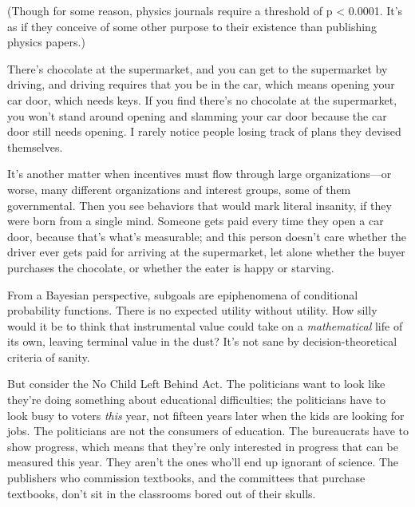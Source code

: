 {
 (Though for some reason, physics journals require a threshold of p
{\textless} 0.0001. It's as if they conceive of some
other purpose to their existence than publishing physics papers.)}

{
 There's chocolate at the supermarket, and you can
get to the supermarket by driving, and driving requires that you be in
the car, which means opening your car door, which needs keys. If you
find there's no chocolate at the supermarket, you
won't stand around opening and slamming your car door
because the car door still needs opening. I rarely notice people losing
track of plans they devised themselves.}

{
 It's another matter when incentives must flow
through large organizations---or worse, many different organizations
and interest groups, some of them governmental. Then you see behaviors
that would mark literal insanity, if they were born from a single mind.
Someone gets paid every time they open a car door, because
that's what's measurable; and this
person doesn't care whether the driver ever gets paid
for arriving at the supermarket, let alone whether the buyer purchases
the chocolate, or whether the eater is happy or starving.}

{
 From a Bayesian perspective, subgoals are epiphenomena of
conditional probability functions. There is no expected utility without
utility. How silly would it be to think that instrumental value could
take on a \textit{mathematical} life of its own, leaving terminal value
in the dust? It's not sane by decision-theoretical
criteria of sanity.}

{
 But consider the No Child Left Behind Act. The politicians want to
look like they're doing something about educational
difficulties; the politicians have to look busy to voters \textit{this}
year, not fifteen years later when the kids are looking for jobs. The
politicians are not the consumers of education. The bureaucrats have to
show progress, which means that they're only interested
in progress that can be measured this year. They aren't
the ones who'll end up ignorant of science. The
publishers who commission textbooks, and the committees that purchase
textbooks, don't sit in the classrooms bored out of
their skulls.}

